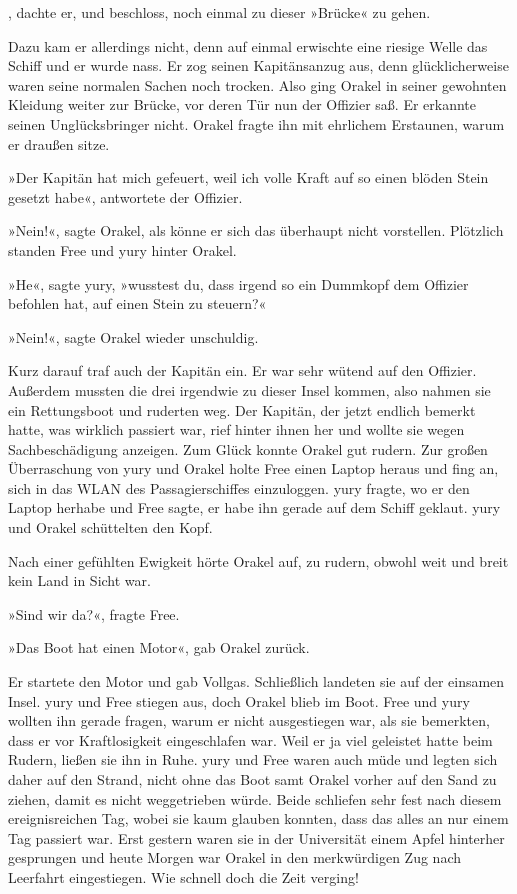 , dachte er, und beschloss, noch einmal zu dieser »Brücke« zu gehen.

Dazu kam er allerdings nicht, denn auf einmal erwischte eine riesige Welle das Schiff und er wurde nass. Er zog seinen Kapitänsanzug aus, denn glücklicherweise waren seine normalen Sachen noch trocken. Also ging Orakel in seiner gewohnten Kleidung weiter zur Brücke, vor deren Tür nun der Offizier saß. Er erkannte seinen Unglücksbringer nicht. Orakel fragte ihn mit ehrlichem Erstaunen, warum er draußen sitze.

»Der Kapitän hat mich gefeuert, weil ich volle Kraft auf so einen blöden Stein gesetzt habe«, antwortete der Offizier.

»Nein!«, sagte Orakel, als könne er sich das überhaupt nicht vorstellen. Plötzlich standen Free und yury hinter Orakel.

»He«, sagte yury, »wusstest du, dass irgend so ein Dummkopf dem Offizier befohlen hat, auf einen Stein zu steuern?«

»Nein!«, sagte Orakel wieder unschuldig.

Kurz darauf traf auch der Kapitän ein. Er war sehr wütend auf den Offizier. Außerdem mussten die drei irgendwie zu dieser Insel kommen, also nahmen sie ein Rettungsboot und ruderten weg. Der Kapitän, der jetzt endlich bemerkt hatte, was wirklich passiert war, rief hinter ihnen her und wollte sie wegen Sachbeschädigung anzeigen. Zum Glück konnte Orakel gut rudern. Zur großen Überraschung von yury und Orakel holte Free einen Laptop heraus und fing an, sich in das WLAN des Passagierschiffes einzuloggen. yury fragte, wo er den Laptop herhabe und Free sagte, er habe ihn gerade auf dem Schiff geklaut. yury und Orakel schüttelten den Kopf.

Nach einer gefühlten Ewigkeit hörte Orakel auf, zu rudern, obwohl weit und breit kein Land in Sicht war.

»Sind wir da?«, fragte Free.

»Das Boot hat einen Motor«, gab Orakel zurück.

Er startete den Motor und gab Vollgas. Schließlich landeten sie auf der einsamen Insel. yury und Free stiegen aus, doch Orakel blieb im Boot. Free und yury wollten ihn gerade fragen, warum er nicht ausgestiegen war, als sie bemerkten, dass er vor Kraftlosigkeit eingeschlafen war. Weil er ja viel geleistet hatte beim Rudern, ließen sie ihn in Ruhe. yury und Free waren auch müde und legten sich daher auf den Strand, nicht ohne das Boot samt Orakel vorher auf den Sand zu ziehen, damit es nicht weggetrieben würde. Beide schliefen sehr fest nach diesem ereignisreichen Tag, wobei sie kaum glauben konnten, dass das alles an nur einem Tag passiert war. Erst gestern waren sie in der Universität einem Apfel hinterher gesprungen und heute Morgen war Orakel in den merkwürdigen Zug nach Leerfahrt eingestiegen. Wie schnell doch die Zeit verging!

